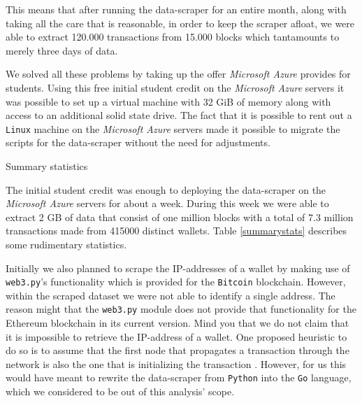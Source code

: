 This means that after running the data-scraper for an entire month, along with taking all the care that is reasonable, in order to keep the scraper afloat, we were able to extract 120.000 transactions from 15.000 blocks which tantamounts to merely three days of data.

We solved all these problems by taking up the offer \emph{Microsoft Azure} provides for students. Using this free initial student credit on the \emph{Microsoft Azure} servers it was possible to set up a virtual machine with 32 GiB of memory along with access to an additional solid state drive. The fact that it is possible to rent out a \texttt{Linux} machine on the \emph{Microsoft Azure} servers made it possible to migrate the scripts for the data-scraper without the need for adjustments.

\begin{table}[h]
\centering
\caption{Summary statistics}

\label{summarystats}
\end{table}

The initial student credit was enough to deploying the data-scraper on the \emph{Microsoft Azure} servers for about a week. During this week we were able to extract 2 GB of data that consist of one million blocks with a total of 7.3 million transactions made from 415000 distinct wallets. Table {\ref{summarystats}} describes some rudimentary statistics.

Initially we also planned to scrape the IP-addresses of a wallet by making use of \texttt{web3.py}'s functionality which is provided for the \texttt{Bitcoin} blockchain. However, within the scraped dataset we were not able to identify a single address. The reason might that the \texttt{web3.py} module does not provide that functionality for the Ethereum blockchain in its current version. Mind you that we do not claim that it is impossible to retrieve the IP-address of a wallet. One proposed heuristic to do so is to assume that the first node that propagates a transaction through the network is also the one that is initializing the transaction \cite{reid2013analysis}. However, for us this would have meant to rewrite the data-scraper from \texttt{Python} into the \texttt{Go} language, which we considered to be out of this analysis' scope.